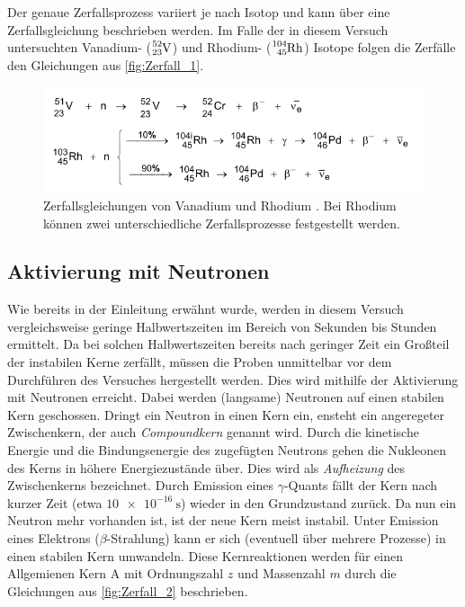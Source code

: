 Der genaue Zerfallsprozess variiert je nach Isotop und kann über eine Zerfallsgleichung beschrieben werden. Im Falle der in diesem Versuch untersuchten Vanadium- ($\ce{^{52}_{23}V}$)
und Rhodium- ($\ce{^{104}_{45}Rh}$) Isotope folgen die Zerfälle den Gleichungen aus \autoref{fig:Zerfall_1}.

\begin{figure}
    \centering
    \includegraphics[width = .7\textwidth]{content/Zerfall_1.png}
    \caption{Zerfallsgleichungen von Vanadium und Rhodium \cite{v702}. Bei Rhodium können zwei unterschiedliche Zerfallsprozesse festgestellt werden.}
    \label{fig:Zerfall_1}
\end{figure}

\subsection{Aktivierung mit Neutronen}
\label{subsec:Aktivierung}
Wie bereits in der Einleitung erwähnt wurde, werden in diesem Versuch vergleichsweise geringe Halbwertszeiten im Bereich von Sekunden bis Stunden ermittelt. Da bei solchen 
Halbwertszeiten bereits nach geringer Zeit ein Großteil der instabilen Kerne zerfällt, müssen die Proben unmittelbar vor dem Durchführen des Versuches hergestellt werden.
Dies wird mithilfe der Aktivierung mit Neutronen erreicht.
Dabei werden (langsame) Neutronen auf einen stabilen Kern geschossen. Dringt ein Neutron in einen Kern ein, ensteht ein angeregeter Zwischenkern, der auch \textit{Compoundkern}
genannt wird. Durch die kinetische Energie und die Bindungsenergie des zugefügten Neutrons gehen die Nukleonen des Kerns in höhere Energiezustände über. Dies wird als 
\textit{Aufheizung} des Zwischenkerns bezeichnet. Durch Emission eines $\gamma$-Quants fällt der Kern nach kurzer Zeit (etwa $\qty{10e-16}{\second}$) wieder in den Grundzustand 
zurück. Da nun ein Neutron mehr vorhanden ist, ist der neue Kern meist instabil. Unter Emission eines Elektrons ($\beta$-Strahlung) kann er sich (eventuell über mehrere Prozesse)
in einen stabilen Kern umwandeln. Diese Kernreaktionen werden für einen Allgemienen Kern A mit Ordnungszahl $z$ und Massenzahl $m$ durch die Gleichungen aus 
\autoref{fig:Zerfall_2} beschrieben.

